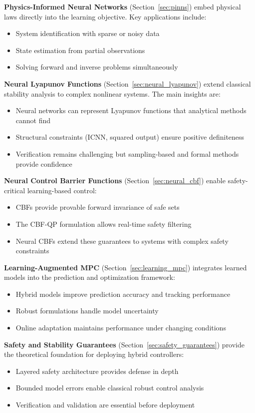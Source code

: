 \textbf{Physics-Informed Neural Networks} (Section~\ref{sec:pinns}) embed physical laws directly into the learning objective. Key applications include:
\begin{itemize}
    \item System identification with sparse or noisy data
    \item State estimation from partial observations
    \item Solving forward and inverse problems simultaneously
\end{itemize}

\textbf{Neural Lyapunov Functions} (Section~\ref{sec:neural_lyapunov}) extend classical stability analysis to complex nonlinear systems. The main insights are:
\begin{itemize}
    \item Neural networks can represent Lyapunov functions that analytical methods cannot find
    \item Structural constraints (ICNN, squared output) ensure positive definiteness
    \item Verification remains challenging but sampling-based and formal methods provide confidence
\end{itemize}

\textbf{Neural Control Barrier Functions} (Section~\ref{sec:neural_cbf}) enable safety-critical learning-based control:
\begin{itemize}
    \item CBFs provide provable forward invariance of safe sets
    \item The CBF-QP formulation allows real-time safety filtering
    \item Neural CBFs extend these guarantees to systems with complex safety constraints
\end{itemize}

\textbf{Learning-Augmented MPC} (Section~\ref{sec:learning_mpc}) integrates learned models into the prediction and optimization framework:
\begin{itemize}
    \item Hybrid models improve prediction accuracy and tracking performance
    \item Robust formulations handle model uncertainty
    \item Online adaptation maintains performance under changing conditions
\end{itemize}

\textbf{Safety and Stability Guarantees} (Section~\ref{sec:safety_guarantees}) provide the theoretical foundation for deploying hybrid controllers:
\begin{itemize}
    \item Layered safety architecture provides defense in depth
    \item Bounded model errors enable classical robust control analysis
    \item Verification and validation are essential before deployment
\end{itemize}

